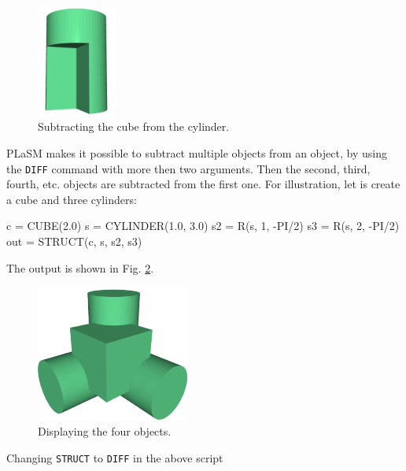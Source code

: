 \begin{figure}[!ht]
\begin{center}
\includegraphics[width=0.23\textwidth]{img/diff-2.png}
\end{center}
\vspace{-4mm}
\caption{Subtracting the cube from the cylinder.}
\label{fig:diff-2}
\end{figure}
\newpage
\noindent
PLaSM makes it possible to subtract multiple objects from an 
object, by using  the {\tt DIFF} command with more then two arguments.
Then the second, third, fourth, etc. objects are subtracted
from the first one. For illustration, let is create a cube and
three cylinders:

\begin{bluecode}
c = CUBE(2.0)
s = CYLINDER(1.0, 3.0)
s2 = R(s, 1, -PI/2)
s3 = R(s, 2, -PI/2)
out = STRUCT(c, s, s2, s3) 
\end{bluecode}
The output is shown in Fig. \ref{fig:diff-3}.

\begin{figure}[!ht]
\begin{center}
\includegraphics[width=0.45\textwidth]{img/diff-3.png}
\end{center}
\vspace{-4mm}
\caption{Displaying the four objects.}
\label{fig:diff-3}
\vspace{-1cm}
\end{figure}
\noindent
\newpage
\noindent
Changing {\tt STRUCT} to {\tt DIFF} in the above script

